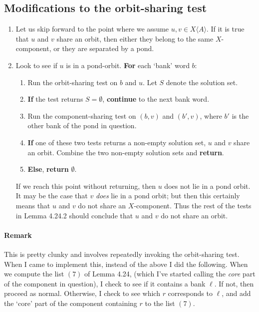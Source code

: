 \documentclass[12pt]{article}
\def\ofA{\langle A \rangle}
\newcommand\alert\textbf
\begin{document}
\subsection{Modifications to the orbit-sharing test}
\begin{enumerate}
	\item Let us skip forward to the point where we assume $u, v \in X\ofA$. If it is true that $u$ and $v$ share an orbit, then either they belong to the same $X$-component, or they are separated by a pond.
	
	\item Look to see if $u$ is in a pond-orbit. \alert{For} each `bank' word $b$:
	\begin{enumerate}
		\item Run the orbit-sharing test on $b$ and $u$. Let $S$ denote the solution set.
		\item \alert{If} the test returns $S=\emptyset$, \alert{continue} to the next bank word.
		\item Run the component-sharing test on $(b, v)$ and $(b', v)$, where $b'$ is the other bank of the pond in question.
		\item \alert{If} one of these two tests returns a non-empty solution set, $u$ and $v$ share an orbit. Combine the two non-empty solution sets and \alert{return}.
		\item \alert{Else}, \alert{return} $\emptyset$.
	\end{enumerate}
	If we reach this point without returning, then $u$ does not lie in a pond orbit. It may be the case that $v$ \emph{does} lie in a pond orbit; but then this certainly means that $u$ and $v$ do not share an $X$-component. Thus the rest of the tests in Lemma 4.24.2 should conclude that $u$ and $v$ do not share an orbit.
\end{enumerate}

\paragraph{Remark} This is pretty clunky and involves repeatedly invoking the orbit-sharing test. When I came to implement this, instead of the above I did the following. When we compute the list  $(7)$ of Lemma 4.24, (which I've started calling the \emph{core} part of the component in question), I check to see if it contains a bank $\ell$. If not, then proceed as normal. Otherwise, I check to see which $r$ corresponds to $\ell$, and add the `core' part of the component containing $r$ to the list $(7)$.
\end{document}
